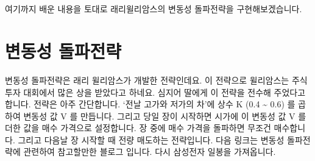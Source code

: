 \documentclass[letterpaper,10pt,english]{jupyterBook}
\begin{document}
\chapter{}
\label{\detokenize{chapter2/2.4.1_Volatility_Breakout:id1}}\label{\detokenize{chapter2/2.4.1_Volatility_Breakout::doc}}
\sphinxAtStartPar
여기까지 배운 내용을 토대로 래리윌리암스의 변동성 돌파전략을 구현해보겠습니다.


\chapter{변동성 돌파전략}
\label{\detokenize{chapter2/2.4.1_Volatility_Breakout:id2}}
\sphinxAtStartPar
변동성 돌파전략은 래리 윌리암스가 개발한 전략인데요. 이 전략으로 윌리암스는 주식투자 대회에서 많은 상을 받았다고 하네요. 심지어 딸에게 이 전략을 전수해 주었다고 합니다. 전략은 아주 간단합니다. ‘전날 고가와 저가의 차’에 상수 K (0.4 \textasciitilde{} 0.6) 를 곱하여 변동성 값 V 를 만듭니다. 그리고 당일 장이 시작하면 시가에 이 변동성 값 V 를 더한 값을 매수 가격으로 설정합니다. 장 중에 매수 가격을 돌파하면 무조건 매수합니다. 그리고 다음날 장 시작할 때 전량 매도하는 전략입니다. 다음 링크는 변동성 돌파전략에 관련하여 참고할만한 블로그 입니다.  다시 삼성전자 일봉을 가져옵니다.
\end{document}
